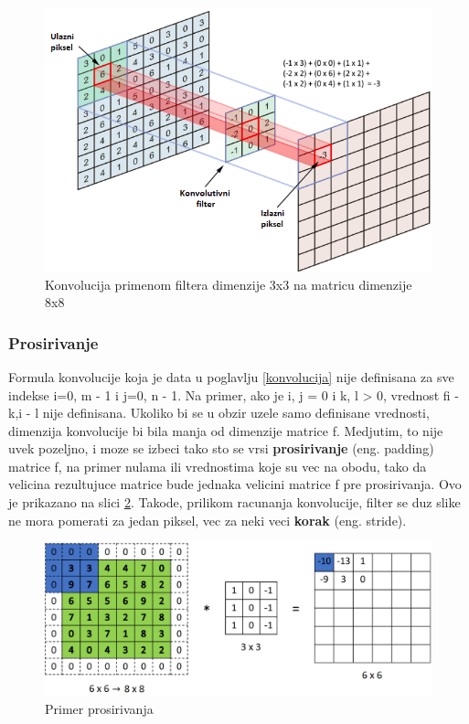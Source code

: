 \documentclass[a4paper]{article}
\begin{document}
\begin{figure}[h!]
\centering
\includegraphics[scale=0.9]{convolution.png}
\caption{Konvolucija primenom filtera dimenzije 3x3 na matricu dimenzije 8x8}
\label{fig:convolution}
\end{figure}

\subsubsection{Prosirivanje}

Formula konvolucije koja je data u poglavlju \ref{konvolucija} nije definisana za sve indekse i=0, m - 1 i j=0, n - 1. Na primer, ako je i, j = 0 i k, l > 0, vrednost fi - k,i - l nije definisana. Ukoliko bi se u obzir uzele samo definisane vrednosti, dimenzija konvolucije bi bila manja od dimenzije matrice f. Medjutim, to nije uvek pozeljno, i moze se izbeci tako sto se vrsi \textbf{prosirivanje} (eng. padding) matrice f, na primer nulama ili vrednostima koje su vec na obodu, tako da velicina rezultujuce matrice bude jednaka velicini matrice f pre prosirivanja. Ovo je prikazano na slici \ref{fig:padding}. Takode, prilikom racunanja konvolucije, filter se duz slike ne mora pomerati za jedan piksel, vec za neki veci \textbf{ korak} (eng. stride).

\begin{figure}[h!]
\begin{center}
\includegraphics[scale=0.38]{padding.png}
\end{center}
\caption{Primer prosirivanja}
\label{fig:padding}
\end{figure}
\end{document}
